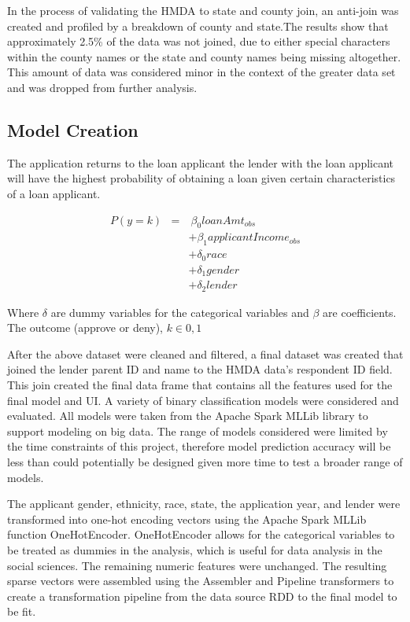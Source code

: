 \documentclass[conference,compsoc]{IEEEtran}
\begin{document}
In the process of validating the HMDA to state and county join, an anti-join was created and profiled by a breakdown of county and state.The results show that approximately 2.5\% of the data was not joined, due to either special characters within the county names or the state and county names being missing altogether. This amount of data was considered minor in the context of the greater data set and was dropped from further analysis.


\subsection{Model Creation}

The application returns to the loan applicant the lender with the loan applicant will have the highest probability of obtaining a loan given certain characteristics of a loan applicant.  

\begin{eqnarray*}
P(y=k) & = & \ \beta_0 loanAmt_{obs}  \\
& &  + \beta_1 applicantIncome_{obs} \\
& & + \delta_0 race  \\ 
& &  + \delta_1 gender \\
& & +  \delta_2 lender 
\end{eqnarray*}

Where $\delta$ are dummy variables for the categorical variables and $\beta$ are coefficients. The outcome (approve or deny), $k \in 0,1$

 \vspace{5mm}

After the above dataset were cleaned and filtered, a final dataset was created that joined the lender parent ID and name to the HMDA data’s respondent ID field. This join created the final data frame that contains all the features used for the final model and UI.
A variety of binary classification models were considered and evaluated. All models were taken from the Apache Spark MLLib library to support modeling on big data. The range of models considered were limited by the time constraints of this project, therefore model prediction accuracy will be less than could potentially be designed given more time to test a broader range of models. 

The applicant gender, ethnicity, race, state, the application year, and lender were transformed into one-hot encoding vectors using the Apache Spark MLLib function OneHotEncoder.  OneHotEncoder allows for the categorical variables to be treated as dummies in the analysis, which is useful for data analysis in the social sciences.  The remaining numeric features were unchanged. The resulting sparse vectors were assembled using the Assembler and Pipeline transformers to create a transformation pipeline from the data source RDD to the final model to be fit. 
\end{document}
